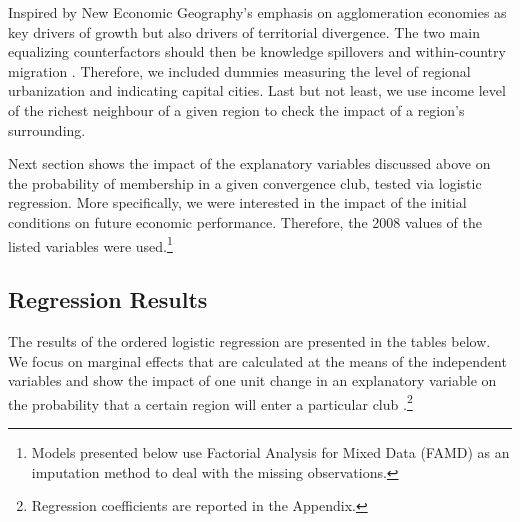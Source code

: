 \documentclass[11pt]{article}
\begin{document}
Inspired by New Economic Geography's emphasis on agglomeration economies as key drivers of growth but also drivers of territorial divergence. The two main equalizing 
counterfactors should then be knowledge spillovers and within-country migration  \citep{iammarino2017regional}. Therefore, we included dummies measuring the level of regional urbanization and indicating capital cities. %
Last but not least, we use income level of the richest neighbour of a given region to check the impact of a region's surrounding.

Next section shows the impact of the explanatory variables discussed above on the probability of membership in a given convergence club, tested via logistic regression. More specifically, we were interested in the impact of the initial conditions on future economic performance. Therefore, the 2008 values of the listed variables were used.\footnote{Models presented below use Factorial Analysis for Mixed Data (FAMD) as an imputation method to deal with the missing observations.}

\subsection{Regression Results}

The results of the ordered logistic regression are presented in the tables below. We focus on marginal effects that are calculated at the means of the independent variables and show the impact of one unit change in an explanatory variable on the probability that a certain region will enter a particular club \citep{carrolloglmx}.\footnote{Regression coefficients are reported in the Appendix.}
\end{document}
